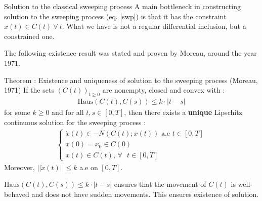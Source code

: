 \documentclass[8pt,aspectratio=169]{beamer}
\begin{document}
\begin{frame}[fragile]{Solution to the classical sweeping process}
    A main bottleneck in constructing solution to the sweeping process (eq. \ref{swp}) is that it has the constraint $x(t) \in C(t) \ \forall \ t$. What we have is not a regular differential inclusion, but a constrained one. 
    

    The following existence result was stated and proven by Moreau, around the year 1971.

    \begin{block}{Theorem : Existence and uniqueness of solution to the sweeping process (Moreau, 1971)}
        If the sets $(C(t))_{t\geq 0}$ are nonempty, closed and convex with :
    \begin{align*}
        \text{Haus}(C(t), C(s)) \leq k\cdot |t-s|
    \end{align*}
    for some $k \geq 0$ and for all $t, s\in [0, T]$, then there exists a \textbf{unique} Lipschitz continuous solution for the sweeping process :
    \begin{align*}
        \begin{cases}
            \dot{x}(t) \in -N(C(t); x(t)) \text{ a.e } t \in [0, T]\\
            x(0) = x_0 \in C(0)\\
            x(t) \in C(t) \text{, } \forall \text{ } t \in [0, T]
        \end{cases}
    \end{align*}
    Moreover, $||\dot{x}(t)|| \leq k$ a.e on $[0, T]$.
        
    \end{block}

    $\text{Haus}(C(t), C(s)) \leq k\cdot |t-s|$ ensures that the movement of $C(t)$ is well-behaved and does not have sudden movements. This ensures existence of solution.
\end{frame}
\end{document}
